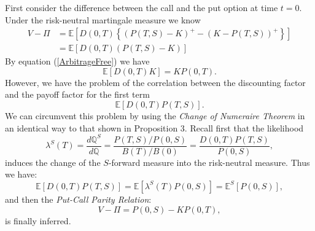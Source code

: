 \begin{demo}
First consider the difference between the call and the put option at time
$t=0$. Under the risk-neutral martingale measure we know
\begin{equation}
\nonumber
\begin{split}
V-\Pi & =\mathbb{E} \left[ D(0,T) \left\{(P(T,S)-K)^+-(K-P(T,S))^+
  \right\} \right]\\
& =\mathbb{E}\left[ D(0,T)(P(T,S)-K) \right]
\end{split}
\end{equation}
By equation (\ref{ArbitrageFree}) we have $$\mathbb{E}\left[ D(0,T)K
\right]=K P(0,T).$$ However, we have the problem of the correlation
between the discounting factor and the payoff factor for the first
term $$\mathbb{E}\left[ D(0,T)P(T,S) \right].$$ We can circumvent this
problem by using the \emph{Change of Numeraire Theorem} in an
identical way to that shown in Proposition 3. Recall first that the
likelihood
$$
\lambda^S(T)=\frac{d\mathbb{Q}^S}{d\mathbb{Q}}=\frac{P(T,S)/P(0,S)}{B(T)/B(0)}=\frac{D(0,T)P(T,S)}{P(0,S)},
$$
induces the change of the $S$-forward measure into the risk-neutral
measure. Thus we have:
$$
\mathbb{E}\left[ D(0,T)P(T,S) \right]=\mathbb{E}\left[
  \lambda^S(T)P(0,S) \right]=\mathbb{E}^S\left[
  P(0,S) \right],
$$
and then the \emph{Put-Call Parity Relation}:
\begin{equation}
\label{PutCall}
V-\Pi=P(0,S)-KP(0,T),
\end{equation}
is finally inferred.
\end{demo}









